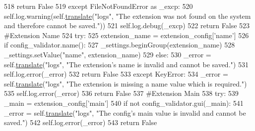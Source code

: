 \begin{DoxyCode}
518             \textcolor{keywordflow}{return} \textcolor{keyword}{False}
519         \textcolor{keywordflow}{except} FileNotFoundError \textcolor{keyword}{as} \_excp:
520             self.log.warning(self.\hyperlink{classcommotion__client_1_1utils_1_1extension__manager_1_1ExtensionManager_a2cfd032ca383c3fd6f0f52b99b6dd67c}{translate}(\textcolor{stringliteral}{"logs"}, \textcolor{stringliteral}{"The extension was not found on the system and
       therefore cannot be saved."}))
521             self.log.debug(\_excp)
522             \textcolor{keywordflow}{return} \textcolor{keyword}{False}
523         \textcolor{comment}{#Extension Name}
524         \textcolor{keywordflow}{try}:
525             extension\_name = extension\_config[\textcolor{stringliteral}{'name'}]
526             \textcolor{keywordflow}{if} config\_validator.name():
527                 \_settings.beginGroup(extension\_name)
528                 \_settings.setValue(\textcolor{stringliteral}{"name"}, extension\_name)
529             \textcolor{keywordflow}{else}:
530                 \_error = self.\hyperlink{classcommotion__client_1_1utils_1_1extension__manager_1_1ExtensionManager_a2cfd032ca383c3fd6f0f52b99b6dd67c}{translate}(\textcolor{stringliteral}{"logs"}, \textcolor{stringliteral}{"The extension's name is invalid and cannot be
       saved."})
531                 self.log.error(\_error)
532                 \textcolor{keywordflow}{return} \textcolor{keyword}{False}
533         \textcolor{keywordflow}{except} KeyError:
534             \_error = self.\hyperlink{classcommotion__client_1_1utils_1_1extension__manager_1_1ExtensionManager_a2cfd032ca383c3fd6f0f52b99b6dd67c}{translate}(\textcolor{stringliteral}{"logs"}, \textcolor{stringliteral}{"The extension is missing a name value which is
       required."})
535             self.log.error(\_error)
536             \textcolor{keywordflow}{return} \textcolor{keyword}{False}
537         \textcolor{comment}{#Extension Main}
538         \textcolor{keywordflow}{try}:
539             \_main = extension\_config[\textcolor{stringliteral}{'main'}]
540             \textcolor{keywordflow}{if} \textcolor{keywordflow}{not} config\_validator.gui(\_main):
541                 \_error = self.\hyperlink{classcommotion__client_1_1utils_1_1extension__manager_1_1ExtensionManager_a2cfd032ca383c3fd6f0f52b99b6dd67c}{translate}(\textcolor{stringliteral}{"logs"}, \textcolor{stringliteral}{"The config's main value is invalid and cannot be
       saved."})
542                 self.log.error(\_error)
543                 \textcolor{keywordflow}{return} \textcolor{keyword}{False}

\end{DoxyCode}

